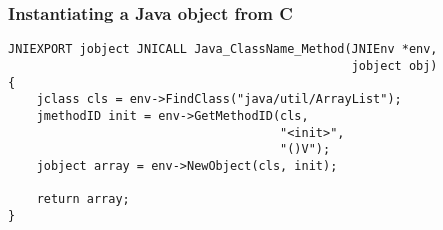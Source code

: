\begin{frame}[fragile]
  \frametitle{Instantiating a Java object from C}
\begin{verbatim}
JNIEXPORT jobject JNICALL Java_ClassName_Method(JNIEnv *env,
                                                jobject obj) 
{
    jclass cls = env->FindClass("java/util/ArrayList");
    jmethodID init = env->GetMethodID(cls,
                                      "<init>",
                                      "()V");
    jobject array = env->NewObject(cls, init);

    return array;
}
\end{verbatim}
\end{frame}
